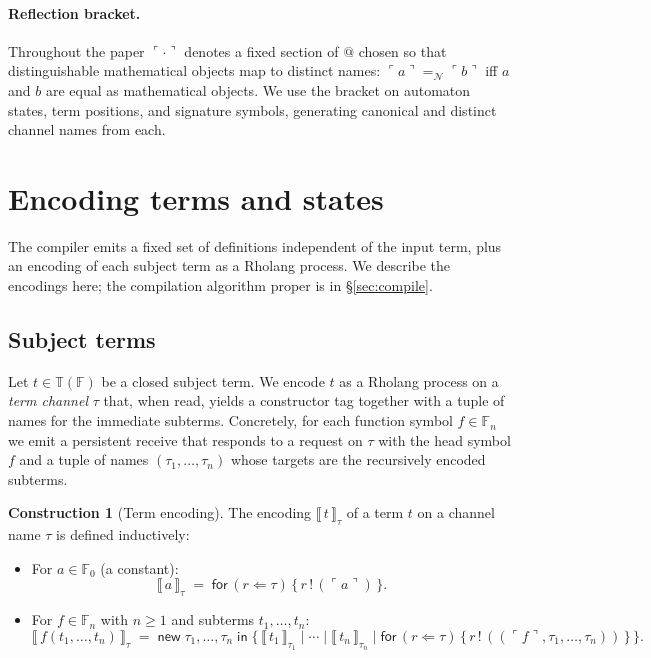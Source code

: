 \documentclass[11pt]{article}
\theoremstyle{plain}
\theoremstyle{definition}
\newtheorem{construction}[theorem]{Construction}
\theoremstyle{remark}
\newcommand{\sem}[1]{\llbracket\,#1\,\rrbracket}
\newcommand{\reflect}[1]{\ulcorner #1 \urcorner}
\newcommand{\Names}{\mathcal{N}}
\newcommand{\Terms}{\mathbb{T}}
\newcommand{\Send}[2]{#1 \,!\, (#2)}
\newcommand{\Bang}[3]{\mathsf{for}\,(#1 \Leftarrow #2)\,\{\,#3\,\}}
\newcommand{\New}[2]{\mathsf{new}\;#1\;\mathsf{in}\;\{\,#2\,\}}
\begin{document}
\paragraph{Reflection bracket.}
Throughout the paper $\reflect{\cdot}$ denotes a fixed section of $@$
chosen so that distinguishable mathematical objects map to distinct
names: $\reflect{a} =_{\Names} \reflect{b}$ iff $a$ and $b$ are equal as
mathematical objects. We use the bracket on automaton states, term
positions, and signature symbols, generating canonical and distinct
channel names from each.

\section{Encoding terms and states}\label{sec:encoding}

The compiler emits a fixed set of definitions independent of the input
term, plus an encoding of each subject term as a Rholang process. We
describe the encodings here; the compilation algorithm proper is in
\S\ref{sec:compile}.

\subsection{Subject terms}\label{ssec:term-encoding}

Let $t \in \Terms(\mathbb{F})$ be a closed subject term. We encode $t$ as a
Rholang process on a \emph{term channel} $\tau$ that, when read, yields a
constructor tag together with a tuple of names for the immediate
subterms. Concretely, for each function symbol $f \in \mathbb{F}_n$ we emit
a persistent receive that responds to a request on $\tau$ with the head
symbol $f$ and a tuple of names $(\tau_1, \ldots, \tau_n)$ whose targets
are the recursively encoded subterms.

\begin{construction}[Term encoding]\label{cons:term-encoding}
The encoding $\sem{t}_{\tau}$ of a term $t$ on a channel name $\tau$ is
defined inductively:
\begin{itemize}[leftmargin=*]
  \item For $a \in \mathbb{F}_0$ (a constant):
  \[
    \sem{a}_{\tau} \;=\; \Bang{r}{\tau}{\Send{r}{\reflect{a}}}.
  \]
  \item For $f \in \mathbb{F}_n$ with $n \ge 1$ and subterms $t_1, \ldots, t_n$:
  \[
    \sem{f(t_1, \ldots, t_n)}_{\tau}
    \;=\;
    \New{\tau_1, \ldots, \tau_n}{
      \sem{t_1}_{\tau_1} \mid \cdots \mid \sem{t_n}_{\tau_n}
      \mid \Bang{r}{\tau}{\Send{r}{(\reflect{f}, \tau_1, \ldots, \tau_n)}}
    }.
  \]
\end{itemize}
\end{construction}
\end{document}
